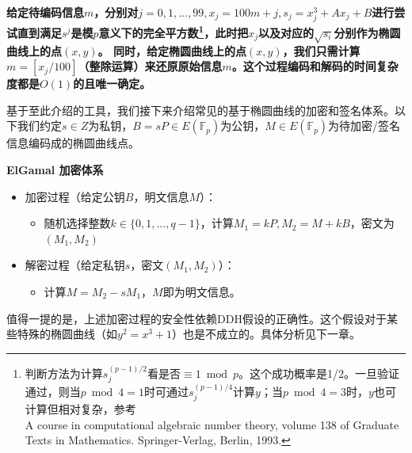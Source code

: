 \documentclass[12pt]{article}
\newcommand{\ec}{椭圆曲线}
\newcommand{\fp}{\mathbb{F}_p}
\begin{document}
\textbf{
给定待编码信息$m$，分别对$j=0,1,...,99, x_j = 100m+j, s_j = x_j^3+Ax_j+B$进行尝试直到满足$s^j$是模$p$意义下的完全平方数\footnote{判断方法为计算$s_j^{(p-1)/2}$看是否$\equiv 1 \bmod p$。这个成功概率是1/2。一旦验证通过，则当$p \bmod 4 =1 $时可通过$s_j^{(p-1)/4}$计算$y$；当$p \bmod 4 = 3$时，$y$也可计算但相对复杂，参考\\A course in computational algebraic number theory, volume 138 of Graduate Texts in Mathematics. Springer-Verlag, Berlin, 1993.}，此时把$x_j$以及对应的$\sqrt{s_i}$分别作为\ec 上的点$(x,y)$。
同时，给定椭圆曲线上的点$(x,y)$，我们只需计算$m=[x_j/100]$（整除运算）来还原原始信息$m$。这个过程编码和解码的时间复杂度都是$O(1)$的且唯一确定。}

基于至此介绍的工具，我们接下来介绍常见的基于\ec 的加密和签名体系。以下我们约定$s \in Z$为私钥，$B=sP \in E(\fp)$为公钥，$M \in E(\fp)$为待加密/签名信息编码成的\ec 点。

\textbf{ElGamal 加密体系}
\begin{itemize}
	\item 加密过程（给定公钥$B$，明文信息$M$）：
	\begin{itemize}
		\item 随机选择整数$k \in \{0,1,...,q-1\}$，计算$M_1 = kP, M_2 = M+kB$，密文为$(M_1,M_2)$
	\end{itemize}
	\item 解密过程（给定私钥$s$，密文$(M_1,M_2)$）：
   \begin{itemize}
   	    \item 计算$M=M_2-sM_1$，$M$即为明文信息。
   \end{itemize}
\end{itemize}
值得一提的是，上述加密过程的安全性依赖DDH假设的正确性。这个假设对于某些特殊的椭圆曲线（如$y^2= x^3+1$）也是不成立的。具体分析见下一章。
\end{document}
